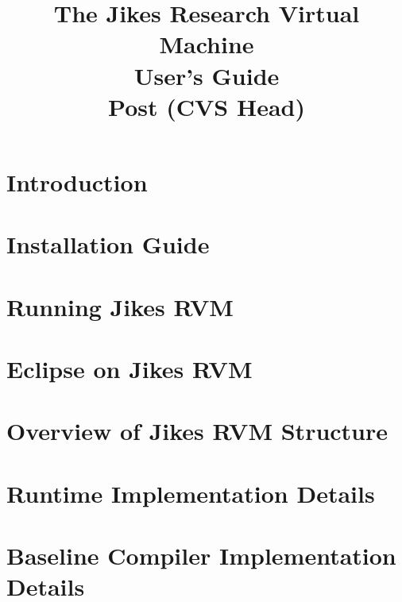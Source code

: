 \documentclass{article}
\title{\texonly{\vfill} {\huge The Jikes\TMboth{} 
Research Virtual Machine \\
User's Guide} \\ {\huge Post \version (CVS Head)}\\ { } \texonly{\vfill} }
\newcommand{\jrvm}{Jikes RVM}
\begin{document}
\maketitle
\date{}

\T \newpage
   \T 
   \T \cleardoublepage

\label{hlxtoc}
\T \tableofcontents
\T \listoffigures
\W {}

\T \newpage
\section{Introduction}


\T \newpage
{}
\section{Installation Guide} \label{section:installation}


\T \newpage
\section{Running \jrvm} \label{section:running}


\T \newpage
\section{Eclipse on Jikes RVM} \label{section:eclipse}


\T \newpage
{}
\section{Overview of \jrvm{} Structure}


\T \newpage
{}
\section{Runtime Implementation Details}


\T \newpage
{}
\section{Baseline Compiler Implementation Details}
\label{section:basedetails}

\end{document}
